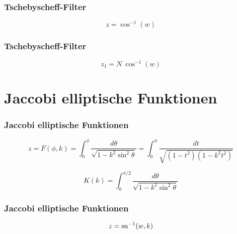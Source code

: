 \documentclass[ngerman, aspectratio=169, xcolor={rgb}]{beamer}
\begin{document}
	\begin{frame}
		\frametitle{Tschebyscheff-Filter}

		\begin{equation*}
			z = \cos^{-1}(w)
		\end{equation*}

		\begin{center}
			\scalebox{0.85}{
				
			}
		\end{center}

	\end{frame}

	\begin{frame}
		\frametitle{Tschebyscheff-Filter}

		\begin{equation*}
			z_1 = N~\cos^{-1}(w)
		\end{equation*}

		\begin{center}
			\scalebox{0.85}{
				
			}
		\end{center}

	\end{frame}


	\section{Jaccobi elliptische Funktionen}

	\begin{frame}
		\frametitle{Jaccobi elliptische Funktionen}


		\begin{equation}
			z
			=
			F(\phi, k)
			=
			\int_{0}^{\phi}
			\frac{
				d\theta
			}{
				\sqrt{
					1-k^2 \sin^2 \theta
				}
			}
			=
			\int_{0}^{\phi}
			\frac{
				dt
			}{
				\sqrt{
					(1-t^2)(1-k^2 t^2)
				}
			}
		\end{equation}

		\begin{equation}
			K(k)
			=
			\int_{0}^{\pi / 2}
			\frac{
				d\theta
			}{
				\sqrt{
					1-k^2 \sin^2 \theta
				}
			}
		\end{equation}



	\end{frame}

	\begin{frame}
		\frametitle{Jaccobi elliptische Funktionen}

		\begin{equation*}
			z = \sn^{-1}(w, k)
		\end{equation*}

		\begin{center}
			\scalebox{0.7}{
				
			}
		\end{center}

	\end{frame}
\end{document}
